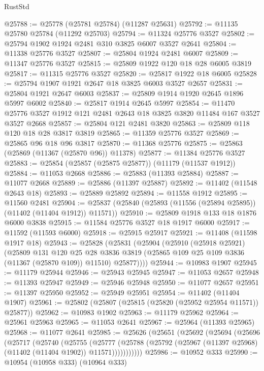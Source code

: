\begin{lexlean}{RustStd}
\begin{coremodule}
@25788 := @25778 (@25781 @25784) (@11287 @25631)
@25792 := @11135 @25780 @25784 (@11292 @25703)
@25794 := @11324 @25776 @3527
@25802 := @25794 @1902 @1924 @2481 @310 @3825 @6007 @3527 @2641
@25804 := @11338 @25776 @3527
@25807 := @25804 @1924 @2481 @6007
@25809 := @11347 @25776 @3527
@25815 := @25809 @1922 @120 @18 @28 @6005 @3819
@25817 := @11315 @25776 @3527
@25820 := @25817 @1922 @18 @6005
@25828 := @25794 @1907 @1921 @2647 @18 @3825 @6003 @3527 @2657
@25831 := @25804 @1921 @2647 @6003
@25837 := @25809 @1914 @1920 @2645 @1896 @5997 @6002
@25840 := @25817 @1914 @2645 @5997
@25854 := @11470 @25776 @3527 @1912 @121 @2481 @2643 @18 @3825 @3820 @11484 @167 @3527 @3527 @2668
@25857 := @25804 @121 @2481 @3820
@25863 := @25809 @118 @120 @18 @28 @3817 @3819
@25865 := @11359 @25776 @3527
@25869 := @25865 @96 @18 @96 @3817
@25870 := @11368 @25776
@25875 := @25863 (@25869 (@11367 (@25870 @96)) @11378)
@25877 := @11384 @25776 @3527
@25883 := @25854 (@25857 (@25875 @25877)) (@11179 (@11537 @1912))
@25884 := @11053 @2668
@25886 := @25883 (@11393 @25884)
@25887 := @11077 @2668
@25889 := @25886 (@11397 @25887)
@25892 := @11402 (@11548 @2643 @18)
@25893 := @25889 @25892
@25894 := @11558 @1912
@25895 := @11560 @2481
@25904 := @25837 (@25840 (@25893 (@11556 (@25894 @25895)) (@11402 (@11404 @1912)) @11571))
@25910 := @25809 @1918 @133 @18 @1876 @6000 @3838
@25915 := @11584 @25776 @3527 @18 @1917 @6000
@25917 := @11592 (@11593 @6000)
@25918 := @25915 @25917
@25921 := @11408 (@11598 @1917 @18)
@25943 := @25828
    (@25831
      (@25904
        (@25910
          (@25918 @25921)
          (@25809
            @131
            @120
            @25
            @28
            @3836
            @3819
            (@25865 @109 @25 @109 @3836 (@11367 (@25870 @109)) @11510)
            @25877))))
@25944 := @10983 @1907
@25945 := @11179 @25944
@25946 := @25943 @25945
@25947 := @11053 @2657
@25948 := @11393 @25947
@25949 := @25946 @25948
@25950 := @11077 @2657
@25951 := @11397 @25950
@25952 := @25949 @25951
@25954 := @11402 (@11404 @1907)
@25961 := @25802 (@25807 (@25815 (@25820 (@25952 @25954 @11571)) @25877))
@25962 := @10983 @1902
@25963 := @11179 @25962
@25964 := @25961 @25963
@25965 := @11053 @2641
@25967 := @25964 (@11393 @25965)
@25968 := @11077 @2641
@25985 := @25626
    (@25651
      (@25692
        (@25694
          (@25696
            (@25717
              (@25740
                (@25755
                  (@25777
                    (@25788
                      (@25792 (@25967 (@11397 @25968) (@11402 (@11404 @1902)) @11571)))))))))))
@25986 := @10952 @333
@25990 := @10954 (@10958 @333) (@10964 @333)

\end{coremodule}
\end{lexlean}
